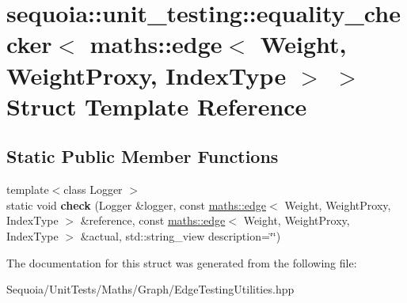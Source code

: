 \hypertarget{structsequoia_1_1unit__testing_1_1equality__checker_3_01maths_1_1edge_3_01_weight_00_01_weight_proxy_00_01_index_type_01_4_01_4}{}\section{sequoia\+::unit\+\_\+testing\+::equality\+\_\+checker$<$ maths\+::edge$<$ Weight, Weight\+Proxy, Index\+Type $>$ $>$ Struct Template Reference}
\label{structsequoia_1_1unit__testing_1_1equality__checker_3_01maths_1_1edge_3_01_weight_00_01_weight_proxy_00_01_index_type_01_4_01_4}
\subsection*{Static Public Member Functions}
\begin{DoxyCompactItemize}
\item 
\mbox{\label{structsequoia_1_1unit__testing_1_1equality__checker_3_01maths_1_1edge_3_01_weight_00_01_weight_proxy_00_01_index_type_01_4_01_4_a4f0ca7d8b78f700ffb9a2aa8b626d96a}} 
{\footnotesize template$<$class Logger $>$ }\\static void {\bfseries check} (Logger \&logger, const \mbox{\hyperlink{classsequoia_1_1maths_1_1edge}{maths\+::edge}}$<$ Weight, Weight\+Proxy, Index\+Type $>$ \&reference, const \mbox{\hyperlink{classsequoia_1_1maths_1_1edge}{maths\+::edge}}$<$ Weight, Weight\+Proxy, Index\+Type $>$ \&actual, std\+::string\+\_\+view description=\char`\"{}\char`\"{})
\end{DoxyCompactItemize}


The documentation for this struct was generated from the following file\+:\begin{DoxyCompactItemize}
\item 
Sequoia/\+Unit\+Tests/\+Maths/\+Graph/Edge\+Testing\+Utilities.\+hpp\end{DoxyCompactItemize}
